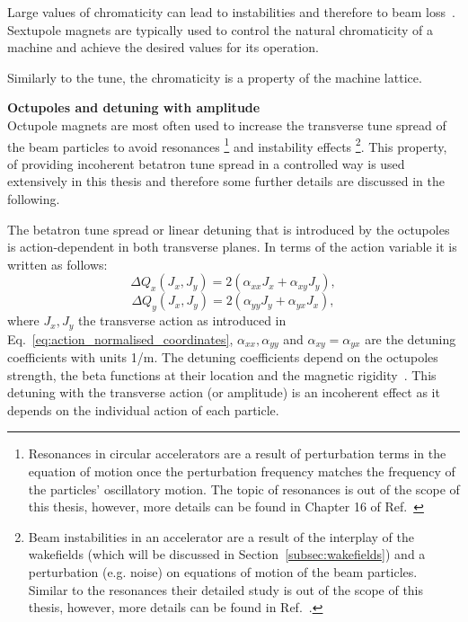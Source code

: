 Large values of chromaticity can lead to instabilities and therefore to beam loss~\cite{Lee:1425444}. Sextupole magnets are typically used to control the natural chromaticity of a machine and achieve the desired values for its operation.

Similarly to the tune, the chromaticity is a property of the machine lattice. %

\textbf{Octupoles and detuning with amplitude}\\
Octupole magnets are most often used to increase the transverse tune spread of the beam particles to avoid resonances \footnote{Resonances in circular accelerators are a result of perturbation terms in the equation of motion once the perturbation frequency matches the frequency of the particles' oscillatory motion. The topic of resonances is out of the scope of this thesis, however, more details can be found in Chapter 16 of Ref.~\cite{Wiedemann:1083415}} and instability effects  \footnote{Beam instabilities in an accelerator are a result of the interplay of the wakefields (which will be discussed in Section~\ref{subsec:wakefields}) and a perturbation (e.g. noise) on equations of motion of the beam particles. Similar to the resonances their detailed study is out of the scope of this thesis, however, more details can be found in Ref.~\cite{Rumolo:1982422}.}. This property, of providing incoherent betatron tune spread in a controlled way is used extensively in this thesis and therefore some further details are discussed in the following.



The betatron tune spread or linear detuning that is introduced by the octupoles is action-dependent in both transverse planes. In terms of the action variable it is written as follows: %
\begin{equation}\label{eq:DQ_with_amplitude_horizontal}
    \Delta Q_x (J_x, J_y) = 2(\alpha_{xx} J_x + \alpha_{xy}J_y),
\end{equation}
\begin{equation}\label{eq:DQ_with_amplitude_vertical}
    \Delta Q_y (J_x, J_y) = 2(\alpha_{yy} J_y + \alpha_{yx}J_x),
\end{equation}
where $J_x, J_y$ the transverse action as introduced in Eq.~\eqref{eq:action_normalised_coordinates}, $\alpha_{xx}, \alpha_{yy}$ and $\alpha_{xy}=\alpha_{yx}$ are the detuning coefficients with units 1/m. The detuning coefficients depend on the octupoles strength, the beta functions at their location and the magnetic rigidity~\cite{Gareyte:321824}. This detuning with the transverse action (or amplitude) is an incoherent effect as it depends on the individual action of each particle.


